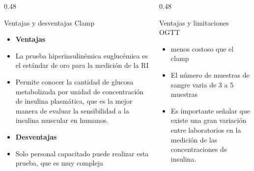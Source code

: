 \documentclass{beamer}
\begin{document}
    \begin{frame}
    \justifying
		\begin{columns}[t]
        
        \begin{column}{0.48\textwidth}
            \begin{block}{Ventajas y desventajas Clamp}
                \begin{itemize}
                    \small %
                    \item[] \textbf{Ventajas}
                    \item La prueba hiperinsulinémica euglucémica es el estándar de oro para la medición de la RI
                    \vspace{0.2cm}
                    \item Permite conocer la cantidad de glucosa metabolizada por unidad de concentración de insulina plasmática, que es la mejor manera de evaluar la sensibilidad a la insulina muscular en humanos.
                    \vspace{0.2cm}
                    \item[] \textbf{Desventajas}
                    \item Solo personal capacitado puede realizar esta prueba, que es muy compleja %
                \end{itemize}
            \end{block}
        \end{column}

        \begin{column}{0.48\textwidth}
            \begin{block}{Ventajas y limitaciones OGTT}
                \begin{itemize}
                    \small
                    \item menos costoso que el clamp
                    \vspace{0.2cm}
                    \item El número de muestras de sangre varia de 3 a 5 muestras
                    \vspace{0.2cm}
                    \item Es importante señalar que existe una gran variación entre laboratorios en la medición de las concentraciones de insulina. %
                \end{itemize}
            \end{block}
        \end{column}
        
    \end{columns}
	\end{frame}
\end{document}
